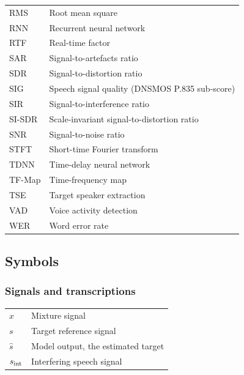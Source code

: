 \begin{longtable}[l]{@{}ll@{}}
RMS & Root mean square \\
RNN & Recurrent neural network \\
RTF & Real-time factor \\
SAR & Signal-to-artefacts ratio \\
SDR & Signal-to-distortion ratio \\
SIG & Speech signal quality (DNSMOS P.835 sub-score) \\
SIR  & Signal-to-interference ratio \\
SI-SDR & Scale-invariant signal-to-distortion ratio \\
SNR & Signal-to-noise ratio \\
STFT  & Short-time Fourier transform \\
TDNN & Time-delay neural network \\
TF-Map & Time-frequency map \\
TSE   & Target speaker extraction \\
VAD & Voice activity detection \\
WER   & Word error rate \\
\end{longtable}



\subsection*{Symbols}

\subsubsection*{Signals and transcriptions}
\begin{longtable}[l]{@{}ll@{}}
$x$ & Mixture signal \\
$s$ & Target reference signal \\
$\hat{s}$ & Model output, the estimated target \\
$s_\textup{int}$ & Interfering speech signal \\
\end{longtable}

